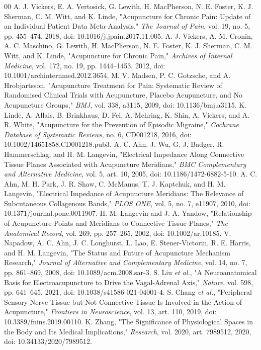 \documentclass[conference]{IEEEtran}
\begin{document}
\begin{thebibliography}{00}
A. J. Vickers, E. A. Vertosick, G. Lewith, H. MacPherson, N. E. Foster, K. J. Sherman, C. M. Witt, and K. Linde, "Acupuncture for Chronic Pain: Update of an Individual Patient Data Meta-Analysis," \emph{The Journal of Pain}, vol. 19, no. 5, pp. 455--474, 2018, doi: 10.1016/j.jpain.2017.11.005.
A. J. Vickers, A. M. Cronin, A. C. Maschino, G. Lewith, H. MacPherson, N. E. Foster, K. J. Sherman, C. M. Witt, and K. Linde, "Acupuncture for Chronic Pain," \emph{Archives of Internal Medicine}, vol. 172, no. 19, pp. 1444--1453, 2012, doi: 10.1001/archinternmed.2012.3654.
M. V. Madsen, P. C. Gotzsche, and A. Hrobjartsson, "Acupuncture Treatment for Pain: Systematic Review of Randomised Clinical Trials with Acupuncture, Placebo Acupuncture, and No Acupuncture Groups," \emph{BMJ}, vol. 338, a3115, 2009, doi: 10.1136/bmj.a3115.
K. Linde, A. Allais, B. Brinkhaus, D. Fei, A. Mehring, K. Shin, A. Vickers, and A. R. White, "Acupuncture for the Prevention of Episodic Migraine," \emph{Cochrane Database of Systematic Reviews}, no. 6, CD001218, 2016, doi: 10.1002/14651858.CD001218.pub3.
A. C. Ahn, J. Wu, G. J. Badger, R. Hammerschlag, and H. M. Langevin, "Electrical Impedance Along Connective Tissue Planes Associated with Acupuncture Meridians," \emph{BMC Complementary and Alternative Medicine}, vol. 5, art. 10, 2005, doi: 10.1186/1472-6882-5-10.
A. C. Ahn, M. H. Park, J. R. Shaw, C. McManus, T. J. Kaptchuk, and H. M. Langevin, "Electrical Impedance of Acupuncture Meridians: The Relevance of Subcutaneous Collagenous Bands," \emph{PLOS ONE}, vol. 5, no. 7, e11907, 2010, doi: 10.1371/journal.pone.0011907.
H. M. Langevin and J. A. Yandow, "Relationship of Acupuncture Points and Meridians to Connective Tissue Planes," \emph{The Anatomical Record}, vol. 269, pp. 257--265, 2002, doi: 10.1002/ar.10185.
V. Napadow, A. C. Ahn, J. C. Longhurst, L. Lao, E. Stener-Victorin, R. E. Harris, and H. M. Langevin, "The Status and Future of Acupuncture Mechanism Research," \emph{Journal of Alternative and Complementary Medicine}, vol. 14, no. 7, pp. 861--869, 2008, doi: 10.1089/acm.2008.sar-3.
S. Liu \emph{et al.}, "A Neuroanatomical Basis for Electroacupuncture to Drive the Vagal-Adrenal Axis," \emph{Nature}, vol. 598, pp. 641--645, 2021, doi: 10.1038/s41586-021-04001-4.
S. Chang \emph{et al.}, "Peripheral Sensory Nerve Tissue but Not Connective Tissue Is Involved in the Action of Acupuncture," \emph{Frontiers in Neuroscience}, vol. 13, art. 110, 2019, doi: 10.3389/fnins.2019.00110.
K. Zhang, "The Significance of Physiological Spaces in the Body and Its Medical Implications," \emph{Research}, vol. 2020, art. 7989512, 2020, doi: 10.34133/2020/7989512.
\end{thebibliography}
\end{document}
